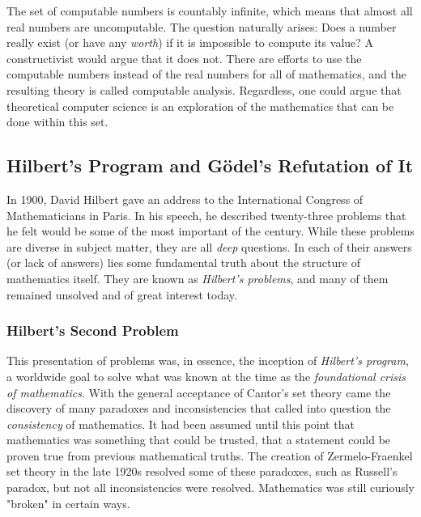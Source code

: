 The set of computable numbers is countably infinite, which means that almost all real numbers are uncomputable. The question naturally arises: Does a number really exist (or have any \textit{worth}) if it is impossible to compute its value? A constructivist would argue that it does not. There are efforts to use the computable numbers instead of the real numbers for all of mathematics, and the resulting theory is called computable analysis. Regardless, one could argue that theoretical computer science is an exploration of the mathematics that can be done within this set. \\


\subsection{Hilbert's Program and G\"odel's Refutation of It}

In 1900, David Hilbert gave an address to the International Congress of Mathematicians in Paris. In his speech, he described twenty-three problems that he felt would be some of the most important of the century. While these problems are diverse in subject matter, they are all \textit{deep} questions. In each of their answers (or lack of answers) lies some fundamental truth about the structure of mathematics itself. They are known as \textit{Hilbert's problems}, and many of them remained unsolved and of great interest today. \\

\subsubsection{Hilbert's Second Problem}

This presentation of problems was, in essence, the inception of \textit{Hilbert's program}, a worldwide goal to solve what was known at the time as the \textit{foundational crisis of mathematics}. With the general acceptance of Cantor's set theory came the discovery of many paradoxes and inconsistencies that called into question the \textit{consistency} of mathematics. It had been assumed until this point that mathematics was something that could be trusted, that a statement could be proven true from previous mathematical truths. The creation of Zermelo-Fraenkel set theory in the late 1920s resolved some of these paradoxes, such as Russell's paradox, but not all inconsistencies were resolved. Mathematics was still curiously "broken" in certain ways. \\

